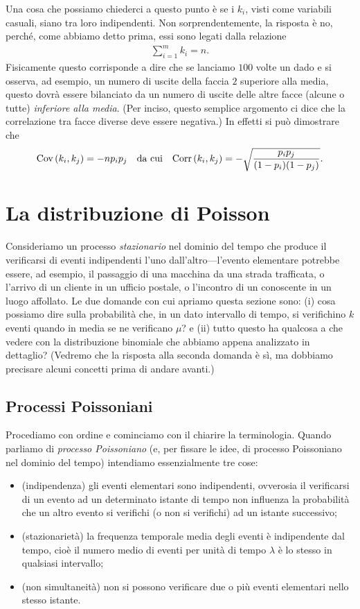 Una cosa che possiamo chiederci a questo punto è se i $k_i$, visti come
variabili casuali, siano tra loro indipendenti. Non sorprendentemente, la
risposta è no, perché, come abbiamo detto prima, essi sono legati dalla
relazione
\begin{align*}
  \sum_{i = 1}^m k_i = n.
\end{align*}
Fisicamente questo corrisponde a dire che se lanciamo $100$ volte un dado e
si osserva, ad esempio, un numero di uscite della faccia $2$ superiore alla
media, questo dovrà essere bilanciato da un numero di uscite delle altre
facce (alcune o tutte) \emph{inferiore alla media}. (Per inciso, questo
semplice argomento ci dice che la correlazione tra facce diverse deve essere
negativa.) In effetti si può dimostrare che
\begin{align}
  \text{Cov}\left(k_i, k_j\right) = -np_ip_j \quad \text{da cui} \quad
  \text{Corr}\left(k_i, k_j\right) = -\sqrt{\frac{p_ip_j}{(1 - p_i)(1 - p_j)}}.
\end{align}


\section{La distribuzione di Poisson}%
\label{sec:poisson_pdf}

Consideriamo un processo \emph{stazionario} nel dominio del tempo che produce
il verificarsi di eventi indipendenti l'uno dall'altro---l'evento elementare
potrebbe essere, ad esempio, il passaggio di una macchina da una strada
trafficata, o l'arrivo di un cliente in un ufficio postale, o l'incontro di un
conoscente in un luogo affollato. Le due domande con cui apriamo questa sezione
sono: (i) cosa possiamo dire sulla probabilità che, in un dato intervallo di
tempo, si verifichino $k$ eventi quando in media se ne verificano $\mu$? e
(ii) tutto questo ha qualcosa a che vedere con la distribuzione binomiale che
abbiamo appena analizzato in dettaglio? (Vedremo che la risposta alla seconda
domanda è sì, ma dobbiamo precisare alcuni concetti prima di andare avanti.)


\subsection{Processi Poissoniani}

Procediamo con ordine e cominciamo con il chiarire la terminologia. Quando
parliamo di \emph{processo Poissoniano} (e, per fissare le idee, di processo
Poissoniano nel dominio del tempo) intendiamo essenzialmente tre cose:
\begin{itemize}
\item (indipendenza) gli eventi elementari sono indipendenti, ovverosia il
  verificarsi di un evento ad un determinato istante di tempo non influenza la
  probabilità che un altro evento si verifichi (o non si verifichi) ad un
  istante successivo;
\item (stazionarietà) la frequenza temporale media degli eventi è
  indipendente dal tempo, cioè il numero medio di eventi per unità di tempo
  $\lambda$ è lo stesso in qualsiasi intervallo;
\item (non simultaneità) non si possono verificare due o più eventi
  elementari nello stesso istante.
\end{itemize}

